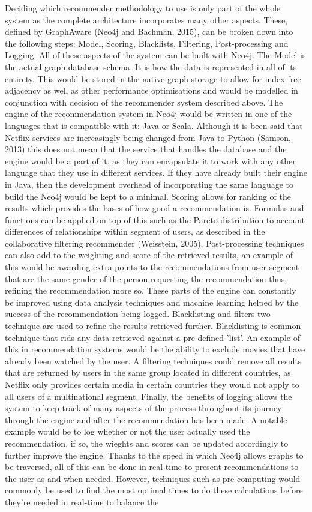 \documentclass[a4paper]{article}
\begin{document}
Deciding which recommender methodology to use is only part of the whole system as the complete architecture incorporates many other aspects. These, defined by GraphAware (Neo4j and Bachman, 2015), can be broken down into the following steps: Model, Scoring, Blacklists, Filtering, Post-processing and Logging. All of these aspects of the system can be built with Neo4j. The Model is the actual graph database schema. It is how the data is represented in all of its entirety. This would be stored in the native graph storage to allow for index-free adjacency as well as other performance optimisations and would be modelled in conjunction with decision of the recommender system described above. The engine of the recommendation system in Neo4j would be written in one of the languages that is compatible with it: Java or Scala. Although it is been said that Netflix services are increasingly being changed from Java to Python (Samson, 2013) this does not mean that the service that handles the database and the engine would be a part of it, as they can encapsulate it to work with any other language that they use in different services. If they have already built their engine in Java, then the development overhead of incorporating the same language to build the Neo4j would be kept to a minimal. Scoring allows for ranking of the results which provides the bases of how good a recommendation is. Formulas and functions can be applied on top of this such as the Pareto distribution to account differences of relationships within segment of users, as described in the collaborative filtering recommender (Weisstein, 2005). Post-processing techniques can also add to the weighting and score of the retrieved results, an example of this would be awarding extra points to the recommendations from user segment that are the same gender of the person requesting the recommendation thus, refining the recommendation more so. These parts of the engine can constantly be improved using data analysis techniques and machine learning helped by the success of the recommendation being logged. Blacklisting and filters two technique are used to refine the results retrieved further. Blacklisting is common technique that rids any data retrieved against a pre-defined 'list'. An example of this in recommendation systems would be the ability to exclude movies that have already been watched by the user. A filtering techniques could remove all results that are returned by users in the same group located in different countries, as Netflix only provides certain media in certain countries they would not apply to all users of a multinational segment. Finally, the benefits of logging allows the system to keep track of many aspects of the process throughout its journey through the engine and after the recommendation has been made. A notable example would be to log whether or not the user actually used the recommendation, if so, the wieghts and scores can be updated accordingly to further improve the engine. Thanks to the speed in which Neo4j allows graphs to be traversed, all of this can be done in real-time to present recommendations to the user as and when needed. However, techniques such as pre-computing would commonly be used to find the most optimal times to do these calculations before they're needed in real-time to balance the 
\end{document}
